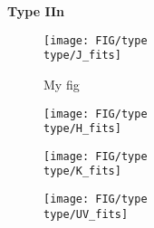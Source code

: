 \renewcommand{\type}{IIn}
\textbf{Type \type}
\begin{figure}[H]
\texttt{[image: FIG/type\\type/J\_fits]}
\caption{\label{fig:FIG/typeIb/J_fits} My fig}
\end{figure}
\begin{figure}[H]
\centering
\texttt{[image: FIG/type\\type/H\_fits]}
\end{figure}
\begin{figure}[H]
\centering
\texttt{[image: FIG/type\\type/K\_fits]}
\end{figure}
\begin{figure}[H]
\centering
\texttt{[image: FIG/type\\type/UV\_fits]}
\end{figure}



